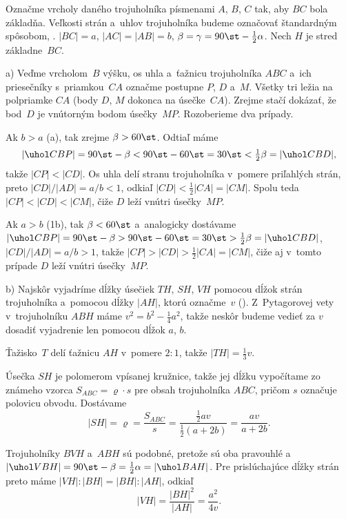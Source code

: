 {%
Označme vrcholy daného trojuholníka písmenami $A$, $B$, $C$ tak, aby $BC$ bola základňa. Veľkosti strán a~uhlov trojuholníka budeme označovať štandardným spôsobom, \tj. $|BC|=a$, $|AC|=|AB|=b$, $\beta=\gamma=90\st-\frac12\alpha$. Nech $H$ je stred základne~$BC$.

\smallskip
a) Veďme vrcholom~$B$ výšku, os uhla a~ťažnicu trojuholníka $ABC$ a~ich priesečníky s~priamkou~$CA$ označme postupne $P$, $D$ a~$M$. Všetky tri ležia na polpriamke $CA$ (body $D$, $M$ dokonca na úsečke~$CA$). Zrejme stačí dokázať, že bod~$D$ je vnútorným bodom úsečky~$MP$. Rozoberieme dva prípady.

Ak $b>a$ (\obr{}a), tak zrejme $\beta>60\st$. Odtiaľ máme
$$
|\uhol CBP|=90\st-\beta<90\st-60\st=30\st<\tfrac12\beta=|\uhol CBD|,
$$
takže $|CP|<|CD|$. Os uhla delí stranu trojuholníka v~pomere priľahlých strán, preto $|CD|/|AD|=a/b<1$, odkiaľ $|CD|<\frac12|CA|=|CM|$. Spolu teda $|CP|<|CD|<|CM|$, čiže $D$ leží vnútri úsečky~$MP$.

Ak $a>b$ (\obrr1b), tak $\beta<60\st$ a~analogicky dostávame $|\uhol CBP|=90\st-\beta>90\st-60\st=30\st>\tfrac12\beta=|\uhol CBD|$, $|CD|/|AD|=a/b>1$, takže $|CP|>|CD|>\frac12|CA|=|CM|$, čiže aj v~tomto prípade $D$ leží vnútri úsečky~$MP$.
%

\smallskip
b)
Najskôr vyjadríme dĺžky úsečiek $TH$, $SH$, $VH$ pomocou dĺžok strán trojuholníka a~pomocou dĺžky $|AH|$, ktorú označme~$v$ (\obr). Z~Pytagorovej vety v~trojuholníku $ABH$ máme $v^2=b^2-\frac14a^2$, takže neskôr budeme vedieť za $v$ dosadiť vyjadrenie len pomocou dĺžok $a$, $b$.

Ťažisko~$T$ delí ťažnicu $AH$ v~pomere $2:1$, takže $|TH|=\frac13v$.

Úsečka $SH$ je polomerom vpísanej kružnice, takže jej dĺžku vypočítame zo známeho vzorca $S_{ABC}=\varrho\cdot s$ pre obsah trojuholníka $ABC$, pričom $s$ označuje polovicu obvodu. Dostávame
$$
|SH|=\varrho=\frac{S_{ABC}}{s}=\frac{\frac12av}{\frac12(a+2b)}=\frac{av}{a+2b}.
$$

Trojuholníky $BVH$ a~$ABH$ sú podobné, pretože sú oba pravouhlé a~$|\uhol VBH|=90\st-\beta=\frac12\alpha=|\uhol BAH|$. Pre prislúchajúce dĺžky strán preto máme $|VH|:|BH|=|BH|:|AH|$, odkiaľ
$$
|VH|=\frac{|BH|^2}{|AH|}=\frac{a^2}{4v}.
$$

}
